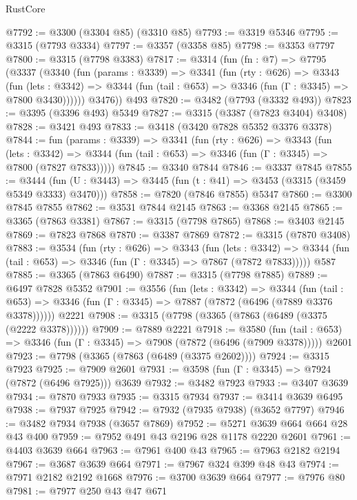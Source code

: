 \begin{lexlean}{RustCore}
\begin{coremodule}
@7792 := @3300 (@3304 @85) (@3310 @85)
@7793 := @3319 @5346
@7795 := @3315 (@7793 @3334)
@7797 := @3357 (@3358 @85)
@7798 := @3353 @7797
@7800 := @3315 (@7798 @3383)
@7817 := @3314
    (fun (fn : @7) =>
    @7795
      (@3337
        (@3340
          (fun (params : @3339) =>
          @3341
            (fun (rty : @626) =>
            @3343
              (fun (lets : @3342) =>
              @3344 (fun (tail : @653) => @3346 (fun (Γ : @3345) => @7800 @3430))))))
        @3476))
    @493
@7820 := @3482 (@7793 (@3332 @493))
@7823 := @3395 (@3396 @493) @5349
@7827 := @3315 (@3387 (@7823 @3404) @3408)
@7828 := @3421 @493
@7833 := @3418 (@3420 @7828 @5352 @3376 @3378)
@7844 := fun (params : @3339) =>
  @3341
    (fun (rty : @626) =>
    @3343
      (fun (lets : @3342) =>
      @3344 (fun (tail : @653) => @3346 (fun (Γ : @3345) => @7800 (@7827 @7833)))))
@7845 := @3340 @7844
@7846 := @3337 @7845
@7855 := @3444 (fun (U : @3443) => @3445 (fun (t : @41) => @3453 (@3315 (@3459 @5349 @3333) @3470)))
@7858 := @7820 (@7846 @7855) @5347
@7860 := @3300 @7845 @7855
@7862 := @3531 @7844 @2145
@7863 := @3368 @2145
@7865 := @3365 (@7863 @3381)
@7867 := @3315 (@7798 @7865)
@7868 := @3403 @2145
@7869 := @7823 @7868
@7870 := @3387 @7869
@7872 := @3315 (@7870 @3408)
@7883 := @3534
    (fun (rty : @626) =>
    @3343
      (fun (lets : @3342) =>
      @3344 (fun (tail : @653) => @3346 (fun (Γ : @3345) => @7867 (@7872 @7833)))))
    @587
@7885 := @3365 (@7863 @6490)
@7887 := @3315 (@7798 @7885)
@7889 := @6497 @7828 @5352
@7901 := @3556
    (fun (lets : @3342) =>
    @3344
      (fun (tail : @653) => @3346 (fun (Γ : @3345) => @7887 (@7872 (@6496 (@7889 @3376 @3378))))))
    @2221
@7908 := @3315 (@7798 (@3365 (@7863 (@6489 (@3375 (@2222 @3378))))))
@7909 := @7889 @2221
@7918 := @3580
    (fun (tail : @653) => @3346 (fun (Γ : @3345) => @7908 (@7872 (@6496 (@7909 @3378)))))
    @2601
@7923 := @7798 (@3365 (@7863 (@6489 (@3375 @2602))))
@7924 := @3315 @7923
@7925 := @7909 @2601
@7931 := @3598 (fun (Γ : @3345) => @7924 (@7872 (@6496 @7925))) @3639
@7932 := @3482 @7923
@7933 := @3407 @3639
@7934 := @7870 @7933
@7935 := @3315 @7934
@7937 := @3414 @3639 @6495
@7938 := @7937 @7925
@7942 := @7932 (@7935 @7938) (@3652 @7797)
@7946 := @3482 @7934 @7938 (@3657 @7869)
@7952 := @5271 @3639 @664 @664 @28 @43 @400
@7959 := @7952 @491 @43 @2196 @28 @1178 @2220 @2601
@7961 := @4403 @3639 @664
@7963 := @7961 @400 @43
@7965 := @7963 @2182 @2194
@7967 := @3687 @3639 @664
@7971 := @7967 @324 @399 @48 @43
@7974 := @7971 @2182 @2192 @1668
@7976 := @3700 @3639 @664
@7977 := @7976 @80
@7981 := @7977 @250 @43 @47 @671

\end{coremodule}
\end{lexlean}
